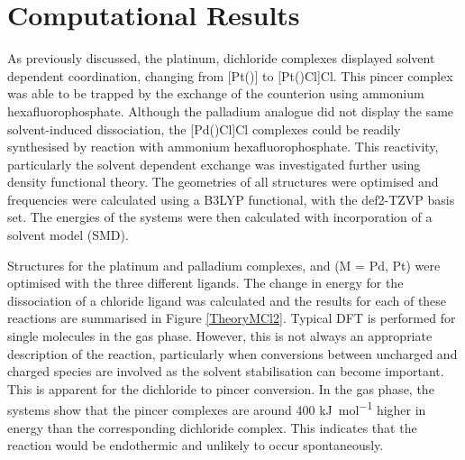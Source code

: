\section{Computational Results}

As previously discussed, the platinum, dichloride complexes displayed solvent dependent coordination, changing from [Pt(\tBuxantphos)] to [Pt(\tBuxantphosk)Cl]Cl.  This pincer complex was able to be trapped by the exchange of the counterion using ammonium hexafluorophosphate.  Although the palladium analogue did not display the same solvent-induced dissociation, the [Pd(\tBuxantphosk)Cl]Cl complexes could be readily synthesised by reaction with ammonium hexafluorophosphate.  This reactivity, particularly the solvent dependent exchange was investigated further using density functional theory.  The geometries of all structures were optimised and frequencies were calculated using a B3LYP functional\cite{Becke1993, Lee1988, Vosko1980, Stephens1994}, with the def2-TZVP basis set\cite{Andrae1990, Weigend2005}.  The energies of the systems were then calculated with incorporation of a solvent model (SMD).

Structures for the platinum and palladium complexes, \ce{[M(diphosphine)Cl2]} and \ce{[M(POP)Cl]+} (M = Pd, Pt) were optimised with the three different \tBuxantphos{} ligands.  The change in energy for the dissociation of a chloride ligand was calculated and the results for each of these reactions are summarised in Figure \ref{TheoryMCl2}.  Typical DFT is performed for single molecules in the gas phase.  However, this is not always an appropriate description of the reaction, particularly when conversions between uncharged and charged species are involved as the solvent stabilisation can become important.  This is apparent for the dichloride to pincer conversion.  In the gas phase, the systems show that the pincer complexes are around 400 \si{\kilo\joule\per\mole} higher in energy than the corresponding dichloride complex.  This indicates that the reaction would be endothermic and unlikely to occur spontaneously.

